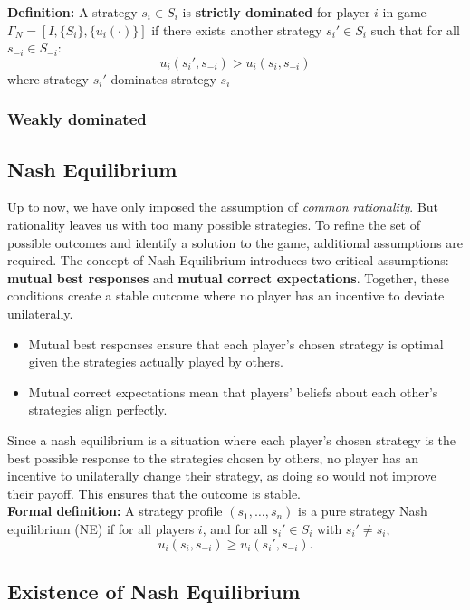 \documentclass{article}
\begin{document}
\noindent \textbf{Definition:} A strategy $s_i \in S_i$ is \textbf{strictly dominated }for player $i$ in game $\Gamma_N = [I, \{S_i\}, \{u_{i}(\cdot)\}]$ if there exists another strategy $s_{i}' \in S_i$ such that for all $s_{-i} \in S_{-i}$: \[
u_{i}(s_{i}', s_{-i}) > u_{i}(s_{i}, s_{-i})
\] 
where strategy $s_{i}'$ dominates strategy $s_i$


\subsubsection{Weakly dominated}



\subsection{Nash Equilibrium}\label{nash}
Up to now, we have only imposed the assumption of \textit{common rationality}. But rationality leaves us with too many possible strategies. To refine the set of possible outcomes and identify a solution to the game, additional assumptions are required. The concept of Nash Equilibrium introduces two critical assumptions: \textbf{mutual best responses} and \textbf{mutual correct expectations}. Together,
these conditions create a stable outcome where no player has an incentive to deviate unilaterally.
\begin{itemize}
    \item Mutual best responses ensure that each player’s chosen strategy is optimal given the strategies actually played by others.
    \item Mutual correct expectations mean that players’ beliefs about each other’s strategies align perfectly.
\end{itemize} 
Since a nash equilibrium is a situation where each player's chosen strategy is the best possible response to the strategies chosen by others, no player has an incentive to unilaterally change their strategy, as doing so would not improve their payoff. This ensures that the outcome is stable.
\\

\textbf{Formal definition:} A strategy profile \((s_1, \ldots, s_n)\) is a pure strategy Nash equilibrium (NE) if for all players \(i\), and for all \(s_i' \in S_i\) with \(s_i' \neq s_i\),
\[
    u_i(s_i, s_{-i}) \geq u_i(s_i', s_{-i}).
\]
 
\subsection{Existence of Nash Equilibrium}
\end{document}
